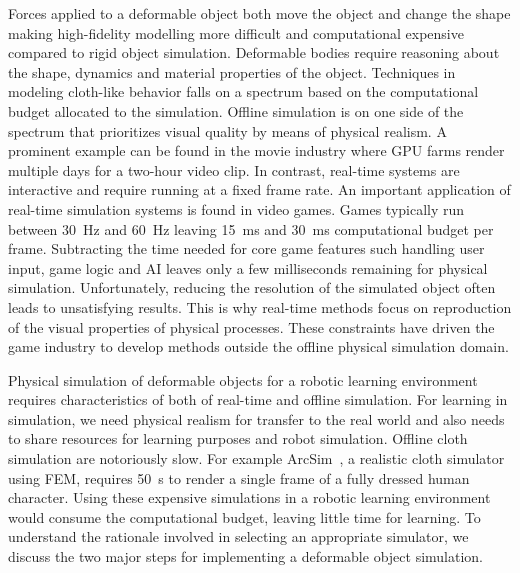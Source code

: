 \documentclass[\home/main.tex]{subfiles}
\begin{document}
Forces applied to a deformable object both move the object and change the shape making high-fidelity modelling more difficult and computational expensive compared to rigid object simulation. Deformable bodies require reasoning about the shape, dynamics and material properties of the object. Techniques in modeling cloth-like behavior falls on a spectrum based on the computational budget allocated to the simulation. Offline simulation is on one side of the spectrum that prioritizes visual quality by means of physical realism. A prominent example can be found in the movie industry where \gls{GPU} farms render multiple days for a two-hour video clip. In contrast, real-time systems are interactive and require running at a fixed frame rate. An important application of real-time simulation systems is found in video games. Games typically run between \SI{30}{\hertz} and \SI{60}{\hertz} leaving \SI{15}{\milli\second} and \SI{30}{\milli\second} computational budget per frame. Subtracting the time needed for core game features such handling user input, game logic and \gls{AI} leaves only a few milliseconds remaining for physical simulation. Unfortunately, reducing the resolution of the simulated object often leads to unsatisfying results. This is why real-time methods focus on reproduction of the visual properties of physical processes. These constraints have driven the game industry to develop methods outside the offline physical simulation domain. 

Physical simulation of deformable objects for a robotic learning environment requires characteristics of both of real-time and offline simulation. For learning in simulation, we need physical realism for transfer to the real world and also needs to share resources for learning purposes and robot simulation. Offline cloth simulation are notoriously slow. For example ArcSim~\autocite{narain2012adaptive}, a realistic cloth simulator using \gls{FEM}, requires \SI{50}{\second} to render a single frame of a fully dressed human character. Using these expensive simulations in a robotic learning environment would consume the computational budget, leaving little time for learning. To understand the rationale involved in selecting an appropriate simulator, we discuss the two major steps for implementing a deformable object simulation.
\end{document}
